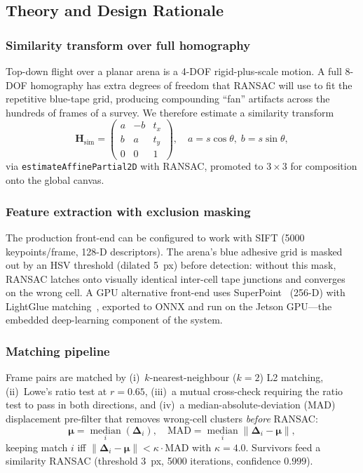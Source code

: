 \documentclass[conference]{IEEEtran}
\begin{document}
\subsection{Theory and Design Rationale}
\subsubsection{Similarity transform over full homography}
Top-down flight over a planar arena is a 4-DOF rigid-plus-scale motion. A full
8-DOF homography has extra degrees of freedom that RANSAC will use to fit the
repetitive blue-tape grid, producing compounding ``fan'' artifacts across the
hundreds of frames of a survey. We therefore estimate a similarity transform
\begin{equation}
\mathbf{H}_\text{sim}=\begin{pmatrix}a&-b&t_x\\ b&a&t_y\\ 0&0&1\end{pmatrix},
\quad a=s\cos\theta,\; b=s\sin\theta,
\end{equation}
via \texttt{estimateAffinePartial2D} with RANSAC, promoted to $3\times3$ for
composition onto the global canvas.

\subsubsection{Feature extraction with exclusion masking}
The production front-end can be configured to work with SIFT (5000 keypoints/frame, 128-D descriptors). The
arena's blue adhesive grid is masked out by an HSV threshold (dilated
\SI{5}{px}) before detection: without this mask, RANSAC latches onto
visually identical inter-cell tape junctions and converges on the wrong cell. A
GPU alternative front-end uses SuperPoint~\cite{superpoint} (256-D) with LightGlue
matching~\cite{lightglue}, exported to ONNX and run on the Jetson GPU---the
embedded deep-learning component of the system.

\subsubsection{Matching pipeline}
Frame pairs are matched by (i)~$k$-nearest-neighbour ($k{=}2$) L2 matching,
(ii)~Lowe's ratio test at $r=0.65$, (iii)~a mutual cross-check requiring the
ratio test to pass in both directions, and (iv)~a median-absolute-deviation (MAD)
displacement pre-filter that removes wrong-cell clusters \emph{before} RANSAC:
\begin{equation}
\bm{\mu}=\operatorname*{median}_i(\bm{\Delta}_i),\quad
\mathrm{MAD}=\operatorname*{median}_i\lVert\bm{\Delta}_i-\bm{\mu}\rVert,
\end{equation}
keeping match $i$ iff $\lVert\bm{\Delta}_i-\bm{\mu}\rVert<\kappa\cdot\mathrm{MAD}$
with $\kappa=4.0$. Survivors feed a similarity RANSAC (threshold \SI{3}{px},
5000 iterations, confidence $0.999$).
\end{document}
